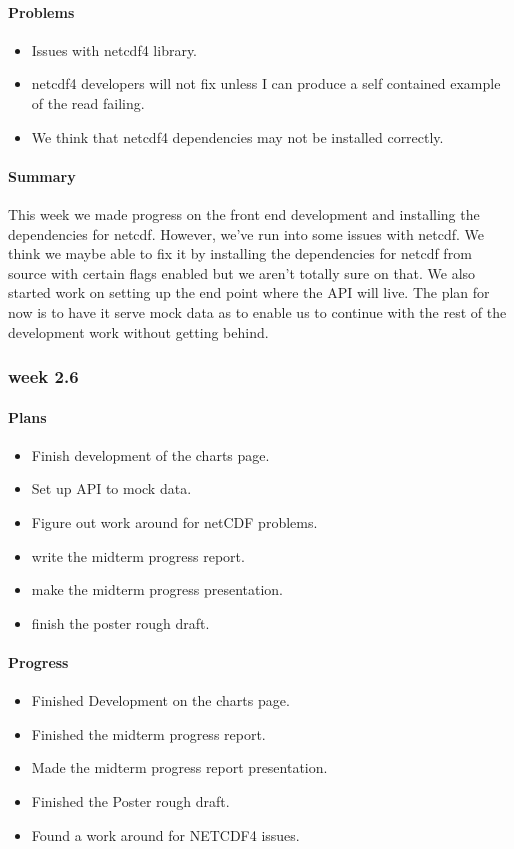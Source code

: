 \documentclass[onecolumn, draftclsnofoot,10pt, compsoc]{article}
\begin{document}
			\paragraph{Problems} \hfill \break
				\begin{itemize}
					\item Issues with netcdf4 library.
					\item netcdf4 developers will not fix unless I can produce a self contained example of the read failing.
					\item We think that netcdf4 dependencies may not be installed correctly.
				\end{itemize}

			\paragraph{Summary} \hfill \break
			 This week we made progress on the front end development and installing the dependencies for netcdf. However, we've run into some issues with netcdf. We think we maybe able to fix it by installing the dependencies for netcdf from source with certain flags enabled but we aren't totally sure on that. We also started work on setting up the end point where the API will live. The plan for now is to have it serve mock data as to enable us to continue with the rest of the development work without getting behind.\\

		\subsubsection{week 2.6}
			\paragraph{Plans} \hfill \break
				\begin{itemize}
					\item Finish development of the charts page.
					\item Set up API to mock data.
					\item Figure out work around for netCDF problems.
					\item write the midterm progress report.
					\item make the midterm progress presentation.
					\item finish the poster rough draft.
				\end{itemize}
			\paragraph{Progress} \hfill \break
				\begin{itemize}
					\item Finished Development on the charts page.
					\item Finished the midterm progress report.
					\item Made the midterm progress report presentation.
					\item Finished the Poster rough draft.
					\item Found a work around for NETCDF4 issues.
				\end{itemize}
\end{document}
